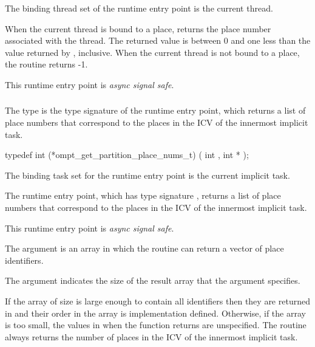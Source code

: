 \binding
The binding thread set of the  runtime entry point
is the current thread.

\descr
When the current thread is bound to a place, 
returns the place number associated with the thread. The returned value 
is between 0 and one less than the value returned by , 
inclusive. When the current thread is not bound to a place, the routine returns -1.

This runtime entry point is \emph{async signal safe}.



\subsubsection{}
\label{sec:ompt_get_partition_place_nums_t}
\label{sec:ompt_get_partition_place_nums}

\summary
The  type is the type signature 
of the  runtime entry point, which 
returns a list of place numbers that correspond to the places in the 
 ICV of the innermost implicit task.

\format
\begin{ccppspecific}
\begin{omptInquiry}
typedef int (*ompt_get_partition_place_nums_t) (
  int ,
  int *
);
\end{omptInquiry}
\end{ccppspecific}

\binding
The binding task set for the  runtime 
entry point is the current implicit task.

\descr
The  runtime entry point, which has
type signature , returns a list of 
place numbers that correspond to the places in the 
ICV of the innermost implicit task.

This runtime entry point is \emph{async signal safe}.

\argdesc
The  argument is an array in which the routine can 
return a vector of place identifiers.

The  argument indicates the size of the result
array that the  argument specifies.

\effect
If the  array of size  is large 
enough to contain all identifiers then they are returned in  
and their order in the array is implementation defined. Otherwise, if the 
 array is too small, the values in  when 
the function returns are unspecified. The routine always returns the number 
of places in the  ICV of the innermost implicit task.

